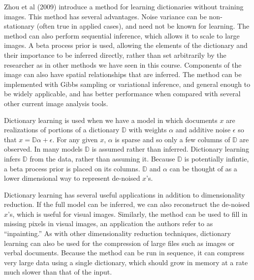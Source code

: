 \documentclass[12pt,letterpaper]{article}
\begin{document}

Zhou et al (2009) introduce a method for learning dictionaries without training images. This method has several advantages. Noise variance can be non-stationary (often true in applied cases), and need not be known for learning. The method can also perform sequential inference, which allows it to scale to large images. A beta process prior is used, allowing the elements of the dictionary and their importance to be inferred directly, rather than set arbitrarily by the researcher as in other methods we have seen in this course. Components of the image can also have spatial relationships that are inferred. The method can be implemented with Gibbs sampling or variational inference, and general enough to be widely applicable, and has better performance when compared with several other current image analysis tools. 


Dictionary learning is used when we have a model in which documents $x$ are realizations of portions of a dictionary $\mathbb{D}$ with weights $\alpha$ and additive noise $\epsilon$ so that $x = \mathbb{D}\alpha + \epsilon$. For any given $x$, $\alpha$ is sparse and so only a few columns of $\mathbb{D}$ are observed. In many models $\mathbb{D}$ is assumed rather than inferred. Dictionary learning infers $\mathbb{D}$ from the data, rather than assuming it. Because $\mathbb{D}$ is potentially infintie, a beta process prior is placed on its columns. $\mathbb{D}$ and $\alpha$ can be thought of as a lower dimensional way to represent de-noised $x$'s. 

Dictionary learning has several useful applications in addition to dimensionality reduction. If the full model can be inferred, we can also reconstruct the de-noised $x$'s, which is useful for visual images. Similarly, the method can be used to fill in missing pixels in visual images, an application the authors refer to as ``inpainting.'' As with other dimensionality reduction techniques, dictionary learning can also be used for the compression of large files such as images or verbal documents. Because the method can be run in sequence, it can compress very large data using a single dictionary, which should grow in memory at a rate much slower than that of the input. 
\end{document}
